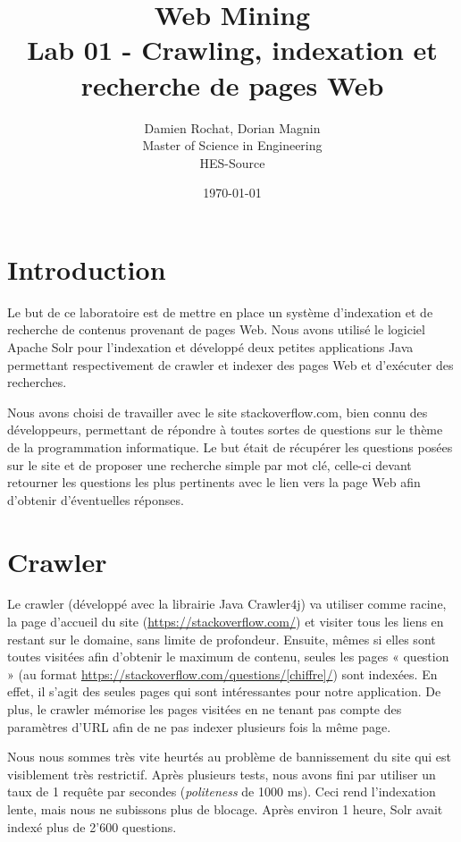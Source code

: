 \documentclass[a4paper]{article}
\title{
	Web Mining \\
	Lab 01 - Crawling, indexation et recherche de pages Web}
\author{
	Damien Rochat, Dorian Magnin \\
	Master of Science in Engineering \\
	HES-Source}
\date{\today}
\begin{document}
	\maketitle
	
	\section{Introduction}
	Le but de ce laboratoire est de mettre en place un système d'indexation et de recherche de contenus provenant de pages Web.
	Nous avons utilisé le logiciel Apache Solr pour l'indexation et développé deux petites applications Java permettant respectivement de crawler
	et indexer des pages Web et d'exécuter des recherches.

	Nous avons choisi de travailler avec le site stackoverflow.com, bien connu des développeurs,
	permettant de répondre à toutes sortes de questions sur le thème de la programmation informatique.
	Le but était de récupérer les questions posées sur le site et de proposer une recherche simple par mot clé,
	celle-ci devant retourner les questions les plus pertinents avec le lien vers la page Web afin d'obtenir d'éventuelles réponses.
	
	\section{Crawler}
	Le crawler (développé avec la librairie Java Crawler4j) va utiliser comme racine, la page d'accueil du site (\url{https://stackoverflow.com/})
	et visiter tous les liens en restant sur le domaine, sans limite de profondeur.
	Ensuite, mêmes si elles sont toutes visitées afin d'obtenir le maximum de contenu,
	seules les pages « question » (au format \url{https://stackoverflow.com/questions/[chiffre]/}) sont indexées.
	En effet, il s'agit des seules pages qui sont intéressantes pour notre application.
	De plus, le crawler mémorise les pages visitées en ne tenant pas compte des paramètres d'URL afin de ne pas indexer plusieurs fois la même page.

	Nous nous sommes très vite heurtés au problème de bannissement du site qui est visiblement très restrictif.
	Après plusieurs tests, nous avons fini par utiliser un taux de 1 requête par secondes (\emph{politeness} de 1000 ms).
	Ceci rend l'indexation lente, mais nous ne subissons plus de blocage.
	Après environ 1 heure, Solr avait indexé plus de 2'600 questions.
\end{document}
